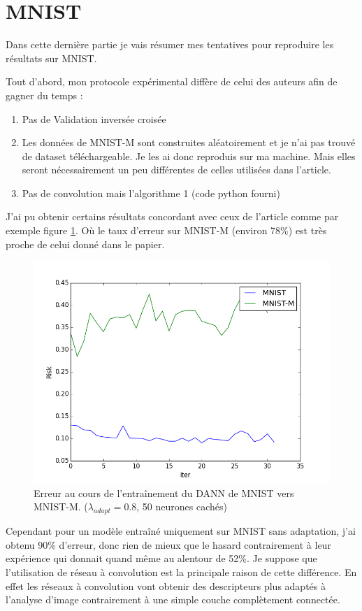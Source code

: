 \documentclass[accepted]{article} %
\begin{document}
\section{MNIST} %
\label{sec:mnist}
Dans cette dernière partie je vais résumer mes tentatives pour reproduire
les résultats sur MNIST.

Tout d'abord, mon protocole expérimental diffère de celui des auteurs afin 
de gagner du temps :
\begin{enumerate}
	\item Pas de Validation inversée croisée
	\item Les données de MNIST-M sont construites aléatoirement et je n'ai
	pas trouvé de dataset téléchargeable. Je les ai donc reproduis sur ma 
	machine. Mais elles seront nécessairement un peu différentes de celles 
	utilisées dans l'article.
	\item Pas de convolution mais l'algorithme 1 (code python fourni)
\end{enumerate}

J'ai pu obtenir certains résultats concordant avec ceux de l'article comme par
exemple figure \ref{fig:mnist-to-m}. Où le taux d'erreur sur MNIST-M (environ 
78\%) est très proche de celui donné dans le papier.

\begin{figure}[ht]
\centering
\includegraphics[width=\columnwidth]{fig/mnist-to-m.png}
\caption{Erreur au cours de l'entraînement du DANN de MNIST vers MNIST-M.
($\lambda_{adapt}=0.8$, 50 neurones cachés)}
\label{fig:mnist-to-m}
\end{figure}


Cependant pour un modèle entraîné uniquement sur MNIST sans adaptation, j'ai
obtenu 90\% d'erreur, donc rien de mieux que le hasard contrairement à leur 
expérience qui donnait quand même au alentour de 52\%. Je suppose que 
l'utilisation de réseau à convolution est la principale raison de cette 
différence. En effet les réseaux à convolution vont obtenir des descripteurs
plus adaptés à l'analyse d'image contrairement à une simple couche complètement
connectée.





\end{document}
